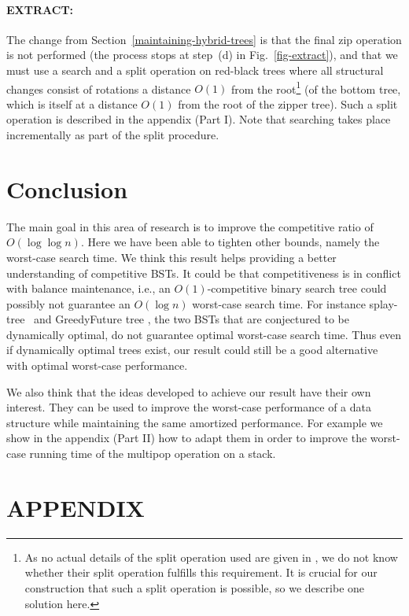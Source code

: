 \documentclass[letterpaper,11pt]{article}
\newcommand{\bottomtree}{bottom tree}
\begin{document}
\paragraph{EXTRACT:} The change from Section~\ref{maintaining-hybrid-trees}
is that the final zip operation is not performed (the process stops at
step~(d) in Fig.~\ref{fig-extract}), and that we must use a search and a
split operation on red-black trees where all structural changes consist of
rotations a distance $O(1)$ from the root\footnote{As no actual details of
the split operation used are given in \cite{tango}, we do not know whether
their split operation fulfills this requirement. It is crucial for our
construction that such a split operation is possible, so we describe one
solution here.} (of the \bottomtree{}, which is itself at a distance $O(1)$
from the root of the zipper tree). Such a split operation is described in
the appendix (Part I). Note that searching takes place incrementally as part of the
split procedure.

\section{Conclusion}

The main goal in this area of research is to improve the competitive ratio of $O(\log \log n)$. Here we have been able to tighten other bounds, namely the worst-case search time. We think this result helps providing a better understanding of competitive BSTs. It could be that competitiveness is in conflict with balance maintenance, i.e., an $O(1)$-competitive binary search tree could possibly not  guarantee an $O(\log n)$ worst-case search time. For instance splay-tree~\cite{splay} and GreedyFuture tree \cite{munro2000competitiveness, geoBST}, the two BSTs that are conjectured to be dynamically optimal, do not guarantee optimal worst-case search time. Thus even if dynamically optimal trees exist, our result could still be a good alternative with optimal worst-case performance. 

We also think that the ideas developed to achieve our result have their own interest. They can be used to improve the worst-case performance of a data structure while maintaining the same amortized performance. For example we show in the appendix (Part II) how to adapt them in order to improve the worst-case running time of the multipop operation on a stack. 

    


\newpage
\section*{APPENDIX}
\end{document}
